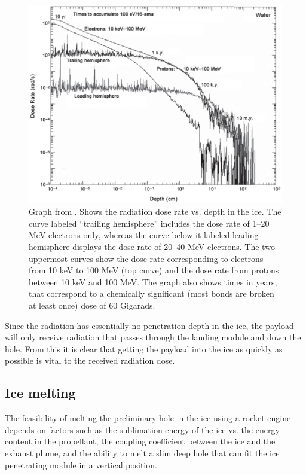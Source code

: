 \begin{figure}
\begin{center}
\includegraphics[scale=0.5]{figures/icerad}
\caption{Graph from \cite{Paranicas_2009}. Shows the radiation dose rate vs. depth in the ice. The curve labeled “trailing hemisphere” includes the dose rate of 1–20 MeV electrons only, whereas the curve below it labeled leading hemisphere displays the dose rate of 20–40 MeV electrons. The two uppermost curves show the dose rate corresponding to electrons from 10 keV to 100 MeV (top curve) and the dose rate from protons between 10 keV and 100 MeV. The graph also shows times in years, that correspond to a chemically significant (most bonds
are broken at least once) dose of 60 Gigarads.}
\label{icerad}
\end{center}
\end{figure}

Since the radiation has essentially no penetration depth in the ice, the payload will only receive radiation that passes through the landing module and down the hole. From this it is clear that getting the payload into the ice as quickly as possible is vital to the received radiation dose. 


\subsection{Ice melting}

The feasibility of melting the preliminary hole in the ice using a rocket engine depends on factors such as the sublimation energy of the ice vs. the energy content in the propellant, the coupling coefficient between the ice and the exhaust plume, and the ability to melt a slim deep hole that can fit the ice penetrating module in a vertical position. 


